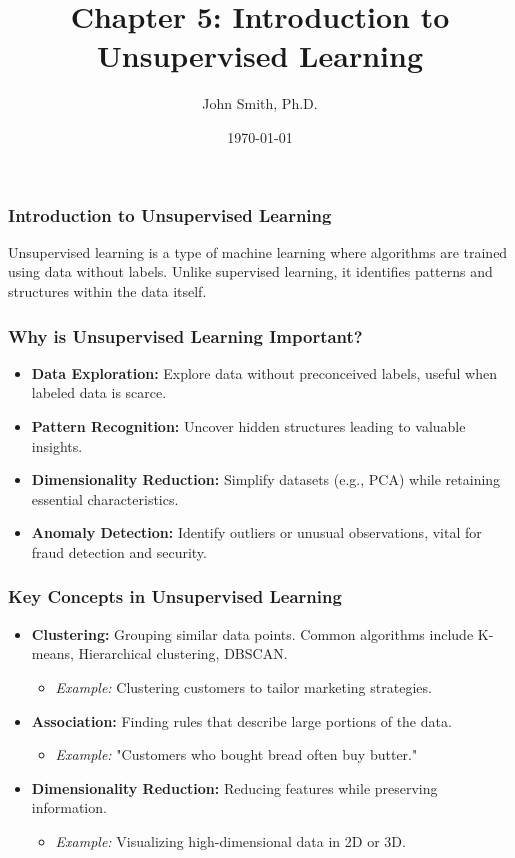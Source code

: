 \documentclass[aspectratio=169]{beamer}
\title[Unsupervised Learning]{Chapter 5: Introduction to Unsupervised Learning}
\author[J. Smith]{John Smith, Ph.D.}
\institute[University Name]{
  Department of Computer Science\\
  University Name\\
  \vspace{0.3cm}
  Email: email@university.edu\\
  Website: www.university.edu
}
\date{\today}
\begin{document}
\frame{\titlepage}

\begin{frame}[fragile]
    \frametitle{Introduction to Unsupervised Learning}
    Unsupervised learning is a type of machine learning where algorithms are trained using data without labels. Unlike supervised learning, it identifies patterns and structures within the data itself.
\end{frame}

\begin{frame}[fragile]
    \frametitle{Why is Unsupervised Learning Important?}
    \begin{itemize}
        \item \textbf{Data Exploration:} Explore data without preconceived labels, useful when labeled data is scarce.
        \item \textbf{Pattern Recognition:} Uncover hidden structures leading to valuable insights.
        \item \textbf{Dimensionality Reduction:} Simplify datasets (e.g., PCA) while retaining essential characteristics.
        \item \textbf{Anomaly Detection:} Identify outliers or unusual observations, vital for fraud detection and security.
    \end{itemize}
\end{frame}

\begin{frame}[fragile]
    \frametitle{Key Concepts in Unsupervised Learning}
    \begin{itemize}
        \item \textbf{Clustering:} Grouping similar data points. Common algorithms include K-means, Hierarchical clustering, DBSCAN.
        \begin{itemize}
            \item \textit{Example:} Clustering customers to tailor marketing strategies.
        \end{itemize}
        
        \item \textbf{Association:} Finding rules that describe large portions of the data.
        \begin{itemize}
            \item \textit{Example:} "Customers who bought bread often buy butter."
        \end{itemize}

        \item \textbf{Dimensionality Reduction:} Reducing features while preserving information.
        \begin{itemize}
            \item \textit{Example:} Visualizing high-dimensional data in 2D or 3D.
        \end{itemize}
    \end{itemize}
\end{frame}
\end{document}
